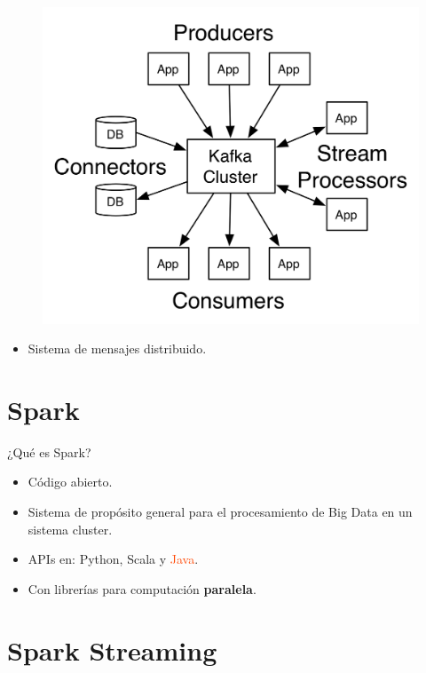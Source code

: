 \documentclass[dvipsnames]{beamer}
\begin{document}
	\begin{frame}
          \begin{figure}[H]
            \centering
            \includegraphics{img/kafka-apis.png}
          \end{figure}
          \begin{itemize}
          \item Sistema de mensajes distribuido.
          \end{itemize}
	\end{frame}

	
	\section{Spark}
	
	\begin{frame}
		¿Qué es Spark?
		\begin{itemize}
			\item Código abierto.
			\item Sistema de propósito general para el procesamiento de Big Data en un sistema cluster.
			\item APIs en: \textcolor{deepBlue}{Python}, \textcolor{deepRed}{Scala} y \textcolor{orangeRed}{Java}.
			\item Con librerías para computación \textbf{paralela}.
		\end{itemize}
	\end{frame}
	
	\section{Spark Streaming}
	
\end{document}
